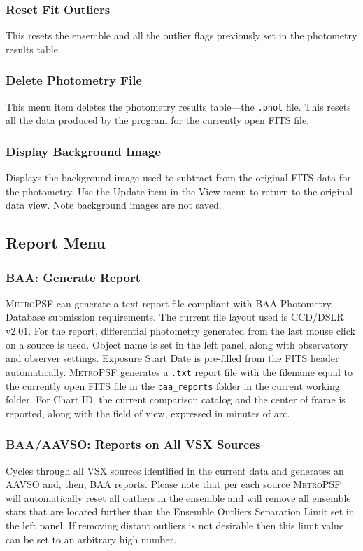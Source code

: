 \documentclass{article}
\begin{document}
\subsubsection{Reset Fit Outliers}
This resets the ensemble and all the outlier flags previously set in the photometry results table. 

\subsubsection{Delete Photometry File}
This menu item deletes the photometry results table---the \texttt{.phot} file. This resets all the data produced by the program for the currently open FITS file. 
\subsubsection{Display Background Image}
Displays the background image used to subtract from the original FITS data for the photometry. Use the Update item in the View menu to return to the original data view. Note background images are not saved.

\subsection{Report Menu}
\subsubsection{BAA: Generate Report}
\label{baa}
\textsc{MetroPSF} can generate a text report file compliant with BAA Photometry Database submission requirements. The current file layout used is CCD/DSLR v2.01. For the report, differential photometry generated from the last mouse click on a source is used. Object name is set in the left panel, along with observatory and observer settings. Exposure Start Date is pre-filled from the FITS header automatically. \textsc{MetroPSF} generates a \texttt{.txt} report file with the filename equal to the currently open FITS file in the \texttt{baa\_reports} folder in the current working folder. For Chart ID, the current comparison catalog and the center of frame is reported, along with the field of view, expressed in minutes of arc. 

\subsubsection{BAA/AAVSO: Reports on All VSX Sources}
Cycles through all VSX sources identified in the current data and generates an AAVSO and, then, BAA reports. Please note that per each source \textsc{MetroPSF} will automatically reset all outliers in the ensemble and will remove all ensemble stars that are located further than the Ensemble Outliers Separation Limit set in the left panel. If removing distant outliers is not desirable then this limit value can be set to an arbitrary high number.  
\end{document}
